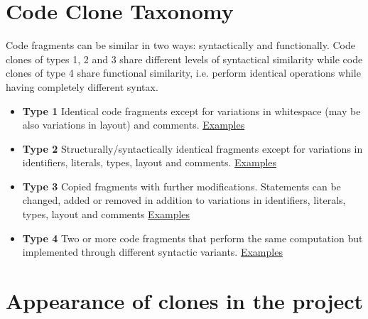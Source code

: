 \documentclass[a0,portrait]{a0poster}
\begin{document}
\begin{multicols}{2}

\section*{Code Clone Taxonomy}

Code fragments can be similar in two ways: syntactically and functionally. Code clones of 
types 1, 2 and 3 share different levels of syntactical similarity while code clones of type 4
share functional similarity, i.e. perform identical operations while having completely different
syntax.

\begin{itemize}
\item \textbf{Type 1} Identical code fragments except for variations in whitespace (may be also
variations in layout) and comments. 
\href{https://gist.github.com/omtcyf0/33a00a4f4406f5933526}{Examples}

\item \textbf{Type 2} Structurally/syntactically identical fragments except for variations in identifiers,
literals, types, layout and comments.
\href{https://gist.github.com/omtcyf0/1e6812f98302f374da53}{Examples}

\item \textbf{Type 3} Copied fragments with further modifications. Statements can be changed,
added or removed in addition to variations in identifiers, literals, types, layout
and comments
\href{https://gist.github.com/omtcyf0/dde978ef6696cf47aff8}{Examples}

\item \textbf{Type 4} Two or more code fragments that perform the same computation but
implemented through different syntactic variants.
\href{https://gist.github.com/omtcyf0/2ce1c8962d9a5552cf35}{Examples}
\end{itemize}


\section*{Appearance of clones in the project}


\end{multicols}
\end{document}
